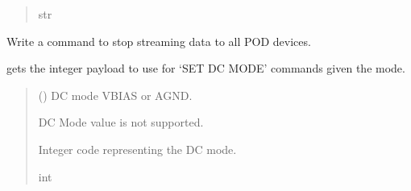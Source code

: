 \documentclass[letterpaper,10pt,english]{sphinxmanual}
\begin{document}
\begin{fulllineitems}
\begin{fulllineitems}
\begin{quote}
\begin{description}
\sphinxAtStartPar
str

\end{description}\end{quote}

\end{fulllineitems}


\begin{fulllineitems}
\label{\detokenize{Setup.SetupOneDevice:Setup.SetupOneDevice.Setup_8401HR.Setup8401HR.StopStream}}
\pysigstartsignatures
{}
\pysigstopsignatures
\sphinxAtStartPar
Write a command to stop streaming data to all POD devices.

\end{fulllineitems}


\begin{fulllineitems}
\label{\detokenize{Setup.SetupOneDevice:Setup.SetupOneDevice.Setup_8401HR.Setup8401HR._CodeDCmode}}
\pysigstartsignatures
{}
\pysigstopsignatures
\sphinxAtStartPar
gets the integer payload to use for ‘SET DC MODE’ commands given the mode.
\begin{quote}\begin{description}
\sphinxAtStartPar
{} () \textendash{} DC mode VBIAS or AGND.

\sphinxAtStartPar
{} \textendash{} DC Mode value is not supported.

\sphinxAtStartPar
Integer code representing the DC mode.

\sphinxAtStartPar
int

\end{description}\end{quote}


\end{fulllineitems}
\end{fulllineitems}
\end{document}
